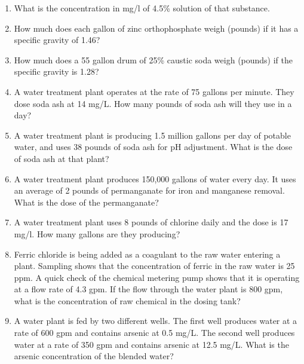 \begin{enumerate}[1.]
\item What is the concentration in mg/l of  4.5\% solution of that substance.\\

\item How much does each gallon of zinc orthophosphate weigh (pounds) if it has a specific gravity of 1.46?\\

\item How much does a 55 gallon drum of 25\% caustic soda weigh (pounds) if the specific gravity is 1.28?\\

\item A water treatment plant operates at the rate of 75 gallons per minute. They dose soda ash at 14 mg/L. How many pounds of soda ash will they use in a day?

\item A water treatment plant is producing 1.5 million gallons per day of potable water, and uses 38 pounds of soda ash for pH adjustment. What is the dose of soda ash at that plant?\\

\item A water treatment plant produces 150,000 gallons of water every day. It uses an average of 2 pounds of permanganate for iron and manganese removal. What is the dose of the permanganate? 


\item A water treatment plant uses 8 pounds of chlorine daily and the dose is 17 mg/l. How many gallons are they producing?\\


\vspace{0.2cm}
\item Ferric chloride is being added as a coagulant to the raw water entering a plant. Sampling shows that the concentration of ferric in the raw water is 25 ppm. A quick check of the chemical metering pump shows that it is operating at a flow rate of 4.3 gpm. If the flow through the water plant is 800 gpm, what is the concentration of raw chemical in the dosing tank?\\

\item A water plant is fed by two different wells. The first well produces water at a rate of 600 gpm and contains arsenic at 0.5 mg/L. The second well produces water at a rate of 350 gpm and contains arsenic at 12.5 mg/L. What is the arsenic concentration of the blended water?\\

\end{enumerate}



